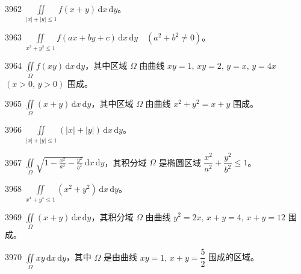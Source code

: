 \begin{prob}[S]{3962}
$\displaystyle \iint\limits_{|x| + |y| \leqslant 1} f(x + y) \,\mathrm{d}x\,\mathrm{d}y$。
\end{prob}

\begin{prob}[S]{3963}
$\displaystyle \iint\limits_{x^2 + y^2 \leqslant 1} f(ax + by + c) \,\mathrm{d}x\,\mathrm{d}y \quad (a^2 + b^2 \neq 0)$。
\end{prob}

\begin{prob}[S]{3964}
$\displaystyle \iint\limits_{\Omega} f(xy) \,\mathrm{d}x\,\mathrm{d}y$，其中区域 $\Omega$ 由曲线 $xy = 1, \, xy = 2, \, y = x, \, y = 4x$ $(x > 0, \, y > 0)$ 围成。
\end{prob}


\begin{prob}[S]{3965}
$\displaystyle \iint\limits_{\Omega} (x + y) \,\mathrm{d}x\,\mathrm{d}y$，其中区域 $\Omega$ 由曲线 $x^2 + y^2 = x + y$ 围成。
\end{prob}

\begin{prob}[S]{3966}
$\displaystyle \iint\limits_{|x| + |y| \leqslant 1} (|x| + |y|) \,\mathrm{d}x\,\mathrm{d}y$。
\end{prob}

\begin{prob}[S]{3967}
$\displaystyle \iint\limits_{\Omega} \sqrt{1 - \frac{x^2}{a^2} - \frac{y^2}{b^2}} \,\mathrm{d}x\,\mathrm{d}y$，其积分域 $\Omega$ 是椭圆区域 $\dfrac{x^2}{a^2} + \dfrac{y^2}{b^2} \leqslant 1$。
\end{prob}

\begin{prob}[S]{3968}
$\displaystyle \iint\limits_{x^4 + y^4 \leqslant 1} (x^2 + y^2) \,\mathrm{d}x\,\mathrm{d}y$。
\end{prob}

\begin{prob}[S]{3969}
$\displaystyle \iint\limits_{\Omega} (x + y) \,\mathrm{d}x\,\mathrm{d}y$，其积分域 $\Omega$ 由曲线 $y^2 = 2x, \, x + y = 4, \, x + y = 12$ 围成。
\end{prob}

\begin{prob}[S]{3970}
$\displaystyle \iint\limits_{\Omega} xy \,\mathrm{d}x\,\mathrm{d}y$，其中 $\Omega$ 是由曲线 $xy = 1, \, x + y = \dfrac{5}{2}$ 围成的区域。
\end{prob}


